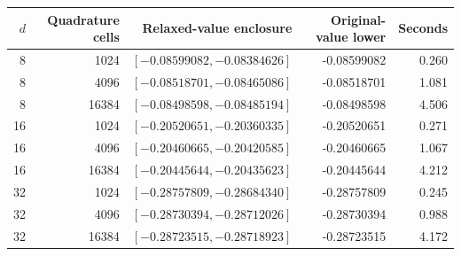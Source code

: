 \begin{tabular}{r r r r r}
\toprule
$d$ & Quadrature cells & Relaxed-value enclosure & Original-value lower & Seconds \\
\midrule
8 & 1024 & $[-0.08599082,-0.08384626]$ & -0.08599082 & 0.260 \\
8 & 4096 & $[-0.08518701,-0.08465086]$ & -0.08518701 & 1.081 \\
8 & 16384 & $[-0.08498598,-0.08485194]$ & -0.08498598 & 4.506 \\
16 & 1024 & $[-0.20520651,-0.20360335]$ & -0.20520651 & 0.271 \\
16 & 4096 & $[-0.20460665,-0.20420585]$ & -0.20460665 & 1.067 \\
16 & 16384 & $[-0.20445644,-0.20435623]$ & -0.20445644 & 4.212 \\
32 & 1024 & $[-0.28757809,-0.28684340]$ & -0.28757809 & 0.245 \\
32 & 4096 & $[-0.28730394,-0.28712026]$ & -0.28730394 & 0.988 \\
32 & 16384 & $[-0.28723515,-0.28718923]$ & -0.28723515 & 4.172 \\
\bottomrule
\end{tabular}
